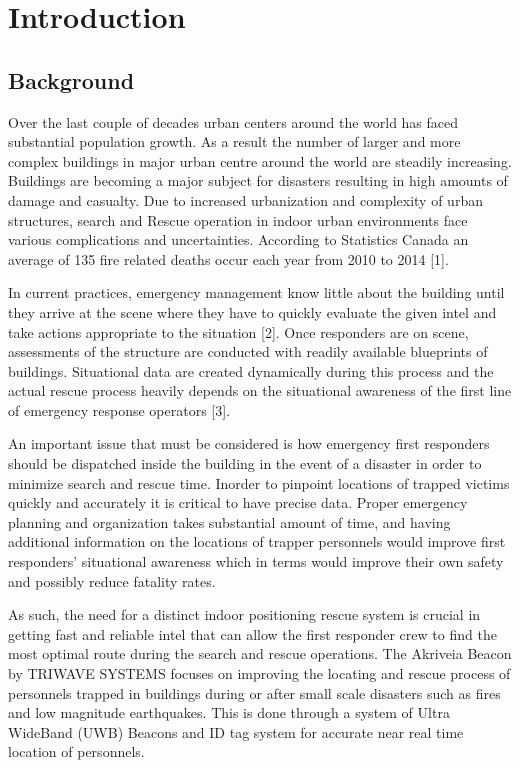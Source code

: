 %


\setcounter{section}{0}
\section{Introduction}
\bigskip
\subsection{Background}
Over the last couple of decades urban centers around the world has faced substantial population growth. As a result the number of larger and more complex buildings in major urban centre around the world are steadily increasing. Buildings are becoming a major subject for disasters resulting in high amounts of damage and casualty. Due to increased urbanization and complexity of urban structures, search and Rescue operation in indoor urban environments face various complications and uncertainties. According to Statistics Canada an average of 135 fire related deaths occur each year from 2010 to 2014 [1].

\bigskip
In current practices, emergency management know little about the building until they arrive at the scene where they have to quickly evaluate the given intel and take actions appropriate to the situation [2]. Once responders are on scene, assessments of the structure are conducted with readily available blueprints of buildings. Situational data are created dynamically during this process and the actual rescue process heavily depends on the situational awareness of the first line of emergency response operators [3]. 

\bigskip
An important issue that must be considered is how emergency first responders should be dispatched inside the building in the event of a disaster in order to minimize search and rescue time. Inorder to pinpoint locations of trapped victims quickly and accurately it is critical to have precise data. Proper emergency planning and organization takes substantial amount of time, and having additional information on the locations of trapper personnels would improve first responders’ situational awareness which in terms would improve their own safety and possibly reduce fatality rates.

\bigskip
As such, the need for a distinct indoor positioning rescue system is crucial in getting fast and reliable intel that can allow the first responder crew to find the most optimal route during the search and rescue operations. The Akriveia Beacon by TRIWAVE SYSTEMS focuses on improving the locating and rescue process of personnels trapped in buildings during or after small scale disasters such as fires and low magnitude earthquakes. This is done through a system of Ultra WideBand (UWB) Beacons and ID tag system for accurate near real time location of personnels. 

